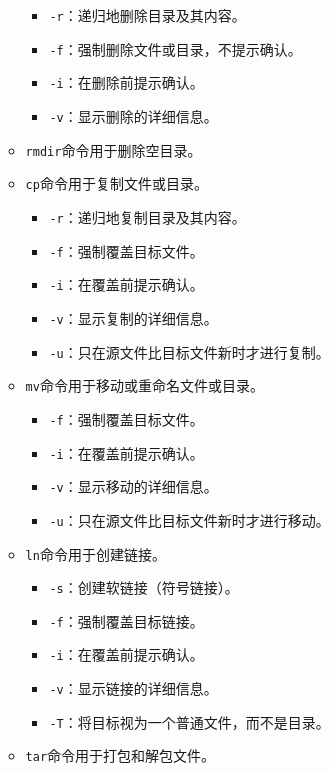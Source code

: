 \documentclass[../main.tex]{subfiles}
\begin{document}
\begin{itemize}
\begin{itemize}
\begin{itemize}
          \item \texttt{-r}：递归地删除目录及其内容。
          \item \texttt{-f}：强制删除文件或目录，不提示确认。
          \item \texttt{-i}：在删除前提示确认。
          \item \texttt{-v}：显示删除的详细信息。
        \end{itemize}
      \item \texttt{rmdir}命令用于删除空目录。
      \item \texttt{cp}命令用于复制文件或目录。
        \begin{itemize}
          \item \texttt{-r}：递归地复制目录及其内容。
          \item \texttt{-f}：强制覆盖目标文件。
          \item \texttt{-i}：在覆盖前提示确认。
          \item \texttt{-v}：显示复制的详细信息。
          \item \texttt{-u}：只在源文件比目标文件新时才进行复制。
        \end{itemize}
      \item \texttt{mv}命令用于移动或重命名文件或目录。
        \begin{itemize}
          \item \texttt{-f}：强制覆盖目标文件。
          \item \texttt{-i}：在覆盖前提示确认。
          \item \texttt{-v}：显示移动的详细信息。
          \item \texttt{-u}：只在源文件比目标文件新时才进行移动。
        \end{itemize}
      \item \texttt{ln}命令用于创建链接。
        \begin{itemize}
          \item \texttt{-s}：创建软链接（符号链接）。
          \item \texttt{-f}：强制覆盖目标链接。
          \item \texttt{-i}：在覆盖前提示确认。
          \item \texttt{-v}：显示链接的详细信息。
          \item \texttt{-T}：将目标视为一个普通文件，而不是目录。
        \end{itemize}
      \item \texttt{tar}命令用于打包和解包文件。
        \begin{itemize}

\end{itemize}
\end{itemize}
\end{itemize}
\end{document}
